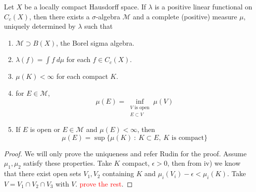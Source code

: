 \begin{theorem}
  Let $X$ be a locally compact Hausdorff space. If $\lambda$ is a
  positive linear functional on $C_c(X)$, then there exists a
  $\sigma$-algebra $\mathcal{M}$ and a  complete (positive) measure
  $\mu$, uniquely
  determined by $\lambda$ such that
  \begin{enumerate}[label=(\arabic*)]
    \item $\mathcal{M} \supset B(X)$, the Borel sigma algebra.
    \item $\lambda(f) = \int  f \ d \mu$ for each $f \in C_c(X)$.
    \item $\mu(K) < \infty$ for each compact $K$.
    \item for $E \in \mathcal{M}$, \[
        \mu(E) = \inf_{\substack{V \textrm{ is open} \\ E \subset V}} \mu(V)
      \]
    \item If $E$ is open or $E \in \mathcal{M}$ and $\mu(E) < \infty$, then \[
        \mu(E) = \sup \{ \mu(K)  \ : \   K \subset E,\  K \textrm{ is
        compact} \}
      \]
  \end{enumerate}
\end{theorem}
\begin{proof}
  We will only prove the uniqueness and refer Rudin for the proof.
  Assume $\mu_{1}, \mu_{2} $ satisfy these properties. Take $K$
compact, $\epsilon > 0$, then from iv) we know that there exist open
sets $V_{1} , V_{2} $ containing $K$ and $\mu_i(V_i) - \epsilon <
\mu_i(K)$. Take $V = V_{1} \cap V_{2} \cap V_{3} $ with $V$.
\textcolor{red}{prove the rest}.
\end{proof}



